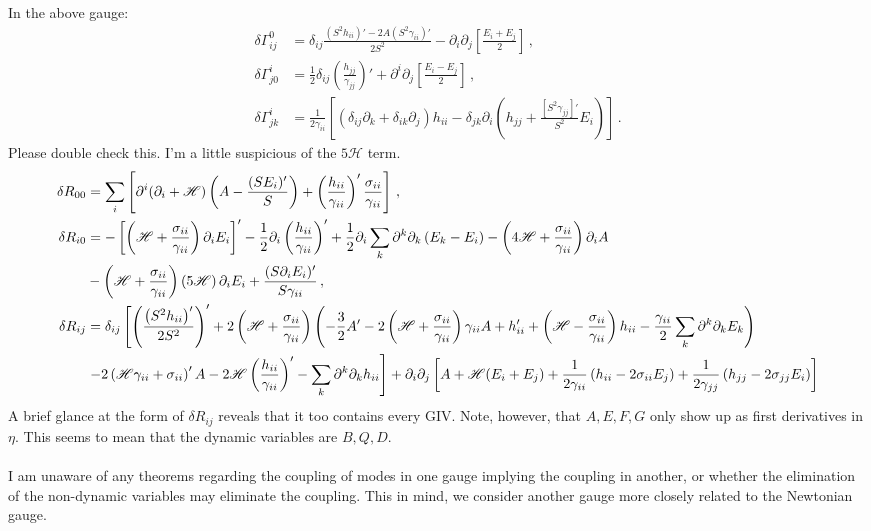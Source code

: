 \documentclass{article}
\newcommand*\scr[1]{\mathscr{#1}}
\newcommand*\p[1]{\left(#1\right)}
\newcommand*\ps[1]{\left[#1\right]}
\newcommand*\f[2]{\frac{#1}{#2}}
\begin{document}
In the above gauge:
\begin{align}
\delta\Gamma^0_{ij}&=\delta_{ij}\f{\p{S^2 h_{ii}}'-2A\p{S^2\gamma_{ii}}'}{2S^2}-\partial_i\partial_j\ps{\f{E_i+E_j}{2}}\,,\\
\delta\Gamma^i_{j0}&=\f12\delta_{ij}\p{\f{h_{jj}}{\gamma_{jj}}}'+\partial^i\partial_j\ps{\f{E_i-E_j}{2}}\,,\\
\delta\Gamma^i_{jk}&=\f{1}{2\gamma_{ii}}\ps{\p{\delta_{ij}\partial_k+\delta_{ik}\partial_j}h_{ii}-\delta_{jk}\partial_i\p{h_{jj}+\f{\ps{S^2\gamma_{jj}}'}{S^2}E_i}}\,.
\end{align}
Please double check this. I'm a little suspicious of the $5\scr H$ term.
\begin{align}
\delta R_{00}&=\sum_i\ps{\partial^i(\partial_i+\scr H)\p{A-\f{(SE_i)'}{S}}+\p{\f{h_{ii}}{\gamma_{ii}}}'\f{\sigma_{ii}}{\gamma_{ii}}}\,,\\
\notag\delta R_{i0}&=-\ps{\p{\scr H+\f{\sigma_{ii}}{\gamma_{ii}}}\partial_iE_i}'-\f12\partial_i\p{\f{h_{ii}}{\gamma_{ii}}}'+\f12\partial_i\sum_k\partial^k\partial_k\p{E_k-E_i}-\p{4\scr H+\f{\sigma_{ii}}{\gamma_{ii}}}\partial_i A\\&-\p{\scr H+\f{\sigma_{ii}}{\gamma_{ii}}}\p{5\scr H}\partial_iE_i+\f{(S\partial_iE_i)'}{S\gamma_{ii}}\,,\\
\notag\delta R_{ij}&=\delta_{ij}\ps{\p{\f{\p{S^2h_{ii}}'}{2S^2}}'+2\p{\scr H+\f{\sigma_{ii}}{\gamma_{ii}}}\p{-\f32 A'-2\p{\scr H+\f{\sigma_{ii}}{\gamma_{ii}}}\gamma_{ii}A+h_{ii}'+\p{\scr H-\f{\sigma_{ii}}{\gamma_{ii}}}h_{ii}-\f{\gamma_{ii}}2\sum_k\partial^k\partial_k E_k}\right.\\&\left.-2\p{\scr H\gamma_{ii}+\sigma_{ii}}'A-2\scr H\p{\f{h_{ii}}{\gamma_{ii}}}'-\sum_k\partial^k\partial_k h_{ii}}+\partial_i\partial_j\ps{A+\scr H(E_i+E_j)+\f1{2\gamma_{ii}}\p{h_{ii}-2\sigma_{ii}E_j}+\f1{2\gamma_{jj}}\p{h_{jj}-2\sigma_{jj}E_i}}
\end{align}
A brief glance at the form of $\delta R_{ij}$ reveals that it too contains every GIV. Note, however, that $A,E,F,G$ only show up as first derivatives in $\eta$. This seems to mean that the dynamic variables are $B,Q,D$.
\\\\
I am unaware of any theorems regarding the coupling of modes in one gauge implying the coupling in another, or whether the elimination of the non-dynamic variables may eliminate the coupling. This in mind, we consider another gauge more closely related to the Newtonian gauge.
\\\\
\end{document}
